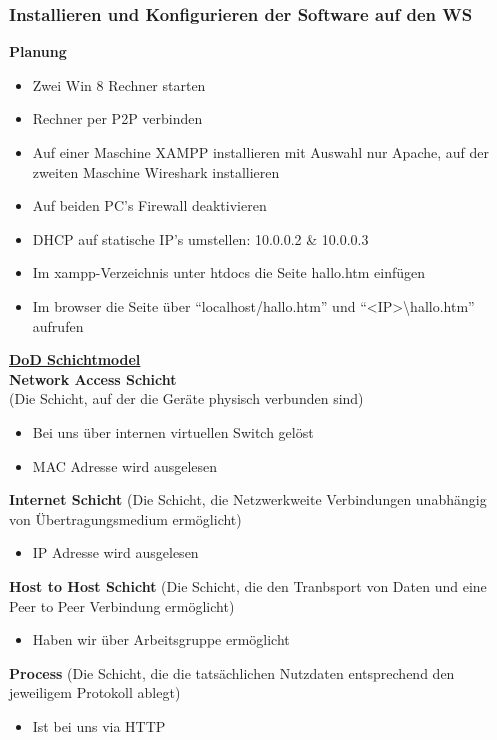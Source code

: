 \subsubsection{Installieren und Konfigurieren der Software auf den WS}
    \textbf{Planung}
    \begin{itemize}
        \item Zwei Win 8 Rechner starten
        \item Rechner per P2P verbinden
        \item Auf einer Maschine XAMPP installieren mit Auswahl nur Apache, auf der zweiten Maschine Wireshark installieren
        \item Auf beiden PC's Firewall deaktivieren
        \item DHCP auf statische IP’s umstellen: 10.0.0.2 \& 10.0.0.3
        \item Im xampp-Verzeichnis unter htdocs  die Seite hallo.htm einfügen
        \item Im browser die Seite über “localhost/hallo.htm” und “<IP>{\textbackslash}hallo.htm” aufrufen
    \end{itemize}
    \vspace{0cm}
    \underline{\textbf{DoD Schichtmodel}}\\
    \textbf{Network Access Schicht}\\
    (Die Schicht, auf der die Geräte physisch verbunden sind)
    \begin{itemize}
        \item Bei uns über internen virtuellen Switch gelöst
        \item MAC Adresse wird ausgelesen
    \end{itemize}
    \vspace{0cm}
    \textbf{Internet Schicht}
    (Die Schicht, die Netzwerkweite Verbindungen unabhängig von Übertragungsmedium ermöglicht)
    \begin{itemize}
        \item IP Adresse wird ausgelesen
    \end{itemize}
    \vspace{0cm}
    \textbf{Host to Host Schicht}
    (Die Schicht, die den Tranbsport von Daten und eine Peer to Peer Verbindung ermöglicht)
    \begin{itemize}
        \item Haben wir über Arbeitsgruppe ermöglicht
    \end{itemize}
    \vspace{0cm}
    \textbf{Process}
    (Die Schicht, die die tatsächlichen Nutzdaten entsprechend den jeweiligem Protokoll ablegt)
    \begin{itemize}
        \item Ist bei uns via HTTP
    \end{itemize}
    
